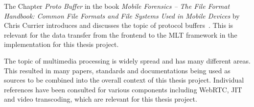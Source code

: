 \documentclass[../MasterThesis.tex]{subfiles}
\begin{document}
\begin{description}[font=\color{RedViolet!80!black}, style=nextline]
		
		
	
		
		
		\item[Protocol buffer] 
		
		The Chapter \textit{Proto Buffer} in the book \textit{Mobile Forensics -- The File Format Handbook: Common File Formats and File Systems Used in Mobile Devices} by Chris Currier introduces and discusses the topic of protocol buffers~\cite{protobuffer}. This is relevant for the data transfer from the frontend to the MLT framework in the implementation for this thesis project.
		
		
		
	
		\newpage
		
		\item[Multimedia processing] 
		
		The topic of multimedia processing is widely spread and has many different areas. This resulted in many papers, standards and documentations being used as sources to be combined into the overall context of this thesis project. Individual references have been consulted for various components including WebRTC, JIT and video transcoding, which are relevant for this thesis project.
		
		
		
		
		
		

		
		
		
		
		
	\end{description}
	
	
	
	
	
	
	
	
	
\end{document}

